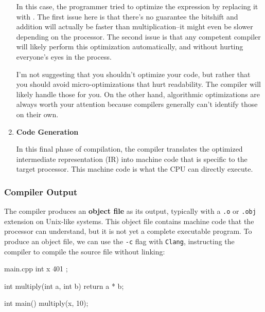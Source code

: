 \documentclass[12pt]{article}
\begin{document}
\begin{enumerate}
\begin{advice}
\noindent
In this case, the programmer tried to optimize the expression  by replacing it with .
The first issue here is that there's no guarantee the bitshift and addition will actually be faster than multiplication--it might even be slower depending on the processor.
The second issue is that any competent compiler will likely perform this optimization automatically, and without hurting everyone's eyes in the process.

\vspace{1em}
\noindent
I'm not suggesting that you shouldn't optimize your code, but rather that you should avoid micro-optimizations that hurt readability.
The compiler will likely handle those for you.
On the other hand, algorithmic optimizations are always worth your attention because compilers generally can't identify those on their own.
\end{advice}

\item{\textbf{Code Generation}}

\noindent
In this final phase of compilation, the compiler translates the optimized intermediate representation (IR) into machine code that is specific to the target processor.
This machine code is what the CPU can directly execute.

\end{enumerate}

\subsubsection{Compiler Output}

\noindent
The compiler produces an \textbf{object file} as its output, typically with a \texttt{.o} or \texttt{.obj} extension on Unix-like systems.
This object file contains machine code that the processor can understand, but it is not yet a complete executable program.
To produce an object file, we can use the \texttt{-c} flag with \texttt{Clang}, instructing the compiler to compile the source file without linking:

\begin{cxx}{main.cpp}
int x { 401 };

int multiply(int a, int b) { return a * b; }

int main() {
	multiply(x, 10);
}
\end{cxx}

\end{document}
